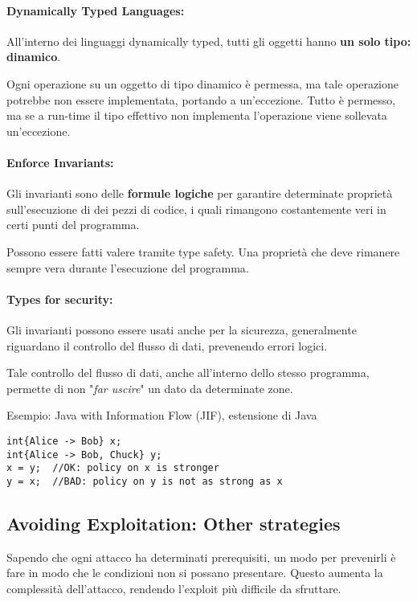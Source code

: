\paragraph{Dynamically Typed Languages:} All'interno dei linguaggi dynamically typed, tutti gli oggetti hanno \textbf{un solo tipo: dinamico}. 

Ogni operazione su un oggetto di tipo dinamico è permessa, ma tale operazione potrebbe non essere implementata, portando a un'eccezione. Tutto è permesso, ma se a run-time il tipo effettivo non implementa l'operazione viene sollevata un'eccezione.

\paragraph{Enforce Invariants:} Gli invarianti sono delle \textbf{formule logiche} per garantire determinate proprietà sull'esecuzione di dei pezzi di codice, i quali rimangono costantemente veri in certi punti del programma. 

Possono essere fatti valere tramite type safety. Una proprietà che deve rimanere sempre vera durante l'esecuzione del programma.

\paragraph{Types for security:} Gli invarianti possono essere usati anche per la sicurezza, generalmente riguardano il controllo del flusso di dati, prevenendo errori logici.

Tale controllo del flusso di dati, anche all'interno dello stesso programma, permette di non "\textit{far uscire}" un dato da determinate zone.

Esempio: Java with Information Flow (JIF), estensione di Java
\begin{verbatim}
int{Alice -> Bob} x;
int{Alice -> Bob, Chuck} y;
x = y;  //OK: policy on x is stronger
y = x;  //BAD: policy on y is not as strong as x
\end{verbatim}

\subsection{Avoiding Exploitation: Other strategies}

Sapendo che ogni attacco ha determinati prerequisiti, un modo per prevenirli è fare in modo che le condizioni non si possano presentare. Questo aumenta la complessità dell'attacco, rendendo l'exploit più difficile da sfruttare.

